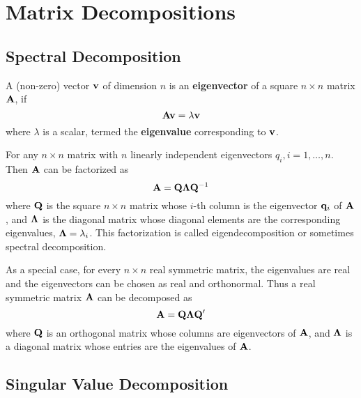 \chapter{Matrix Decompositions}\label{chapter:matrix-decompositions}

\section{Spectral Decomposition}

\begin{definition}
	A (non-zero) vector \(\mathbf{v}\) of dimension \(n\) is an \textbf{eigenvector} of a square \(n\times n\) matrix \(\mathbf{A}\), if
	\begin{equation}
		\mathbf{A}\mathbf{v}=\lambda\mathbf{v}
	\end{equation}
	where \(\lambda\) is a scalar, termed the \textbf{eigenvalue} corresponding to \(\mathbf{v}\).
\end{definition}

\begin{definition}
	For any \(n\times n\) matrix with \(n\) linearly independent eigenvectors \(q_{i},i=1,\ldots,n\). Then \(\mathbf{A}\) can be factorized as
	\begin{equation*}
		\mathbf{A}=\mathbf{Q}\boldsymbol{\Lambda}\mathbf{Q}^{-1}
	\end{equation*}
	where \(\mathbf{Q}\) is the square \(n\times n\) matrix whose \(i\)-th column is the eigenvector \(\mathbf{q}_{i}\) of \(\mathbf{A}\), and \(\boldsymbol{\Lambda}\) is the diagonal matrix whose diagonal elements are the corresponding eigenvalues, \(\boldsymbol{\Lambda}=\lambda_{i}\). This factorization is called eigendecomposition or sometimes spectral decomposition.
\end{definition}

\begin{example}
	As a special case, for every \(n\times n\) real symmetric matrix, the eigenvalues are real and the eigenvectors can be chosen as real and orthonormal. Thus a real symmetric matrix \(\mathbf{A}\) can be decomposed as
	\begin{equation}
		\mathbf{A}=\mathbf{Q}\boldsymbol{\Lambda}\mathbf{Q}^{\prime}
	\end{equation}
	where \(\mathbf{Q}\) is an orthogonal matrix whose columns are  eigenvectors of \(\mathbf{A}\), and \(\boldsymbol{\Lambda}\) is a diagonal matrix whose entries are the eigenvalues of \(\mathbf{A}\).
\end{example}

\section{Singular Value Decomposition}

